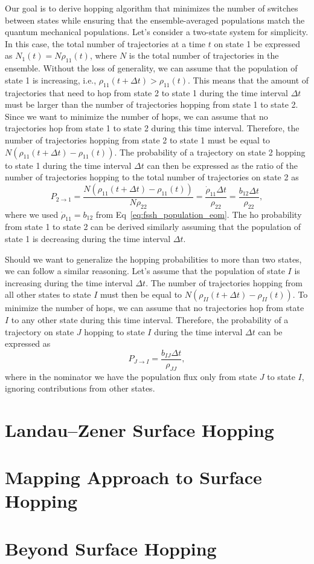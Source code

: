 Our goal is to derive hopping algorithm that minimizes the number of switches between states while ensuring that the ensemble-averaged populations match the quantum mechanical populations. Let's consider a two-state system for simplicity. In this case, the total number of trajectories at a time $t$ on state 1 be expressed as $N_1(t)=N\rho_{11}(t)$, where $N$ is the total number of trajectories in the ensemble. Without the loss of generality, we can assume that the population of state 1 is increasing, i.e., $\rho_{11}(t+\Delta t)>\rho_{11}(t)$. This means that the amount of trajectories that need to hop from state 2 to state 1 during the time interval $\Delta t$ must be larger than the number of trajectories hopping from state 1 to state 2. Since we want to minimize the number of hops, we can assume that no trajectories hop from state 1 to state 2 during this time interval. Therefore, the number of trajectories hopping from state 2 to state 1 must be equal to $N\left(\rho_{11}(t+\Delta t)-\rho_{11}(t)\right)$. The probability of a trajectory on state 2 hopping to state 1 during the time interval $\Delta t$ can then be expressed as the ratio of the number of trajectories hopping to the total number of trajectories on state 2 as
\begin{equation}\label{eq:fssh_hopping_probability_two_state}
    P_{2\to 1}=\frac{N\left(\rho_{11}(t+\Delta t)-\rho_{11}(t)\right)}{N\rho_{22}}=\frac{\dot\rho_{11}\Delta t}{\rho_{22}}=\frac{b_{12}\Delta t}{\rho_{22}},
\end{equation}
where we used $\dot\rho_{11}=b_{12}$ from Eq~\eqref{eq:fssh_population_eom}. The ho probability from state 1 to state 2 can be derived similarly assuming that the population of state 1 is decreasing during the time interval $\Delta t$.

Should we want to generalize the hopping probabilities to more than two states, we can follow a similar reasoning. Let's assume that the population of state $I$ is increasing during the time interval $\Delta t$. The number of trajectories hopping from all other states to state $I$ must then be equal to $N\left(\rho_{II}(t+\Delta t)-\rho_{II}(t)\right)$. To minimize the number of hops, we can assume that no trajectories hop from state $I$ to any other state during this time interval. Therefore, the probability of a trajectory on state $J$ hopping to state $I$ during the time interval $\Delta t$ can be expressed as
\begin{equation}\label{eq:fssh_hopping_probability_multistate}
P_{J\to I}=\frac{b_{IJ}\Delta t}{\rho_{JJ}},
\end{equation}
where in the nominator we have the population flux only from state $J$ to state $I$, ignoring contributions from other states.
\section{Landau--Zener Surface Hopping}\label{sec:landau_zener}
\section{Mapping Approach to Surface Hopping}\label{sec:mapping_approach}
\section{Beyond Surface Hopping}\label{sec:beyond_surface_hopping}

